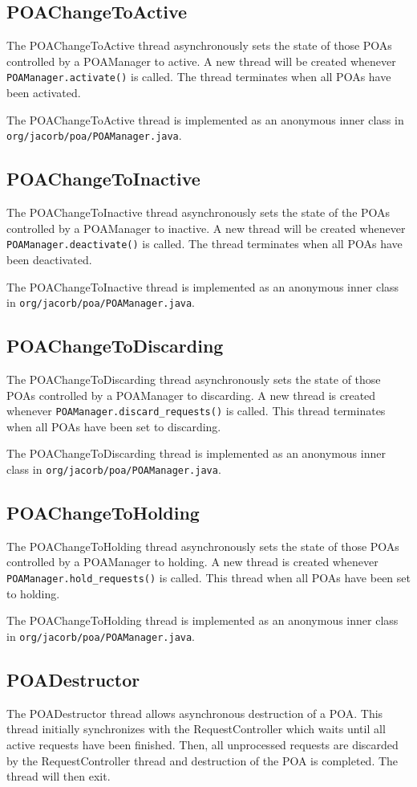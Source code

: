 \subsection*{POAChangeToActive}
The POAChangeToActive thread asynchronously sets the state of those POAs
controlled by a POAManager to active. A new thread will be created whenever
{\tt POAManager.activate()} is called. The thread terminates when all POAs
have been activated.

The POAChangeToActive thread is implemented as an anonymous inner class in
{\tt org/jacorb/poa/POAManager.java}.

\subsection*{POAChangeToInactive}
The POAChangeToInactive thread asynchronously sets the state of the POAs
controlled by a POAManager to inactive. A new thread will be created whenever
{\tt POAManager.deactivate()} is called. The thread terminates when all
POAs have been deactivated.

The POAChangeToInactive thread is implemented as an anonymous inner class in
{\tt org/jacorb/poa/POAManager.java}.

\subsection*{POAChangeToDiscarding}
The POAChangeToDiscarding thread asynchronously sets the state of those POAs
controlled by a POAManager to discarding. A new thread is created whenever
{\tt POAManager.discard\_requests()} is called. This thread terminates when
all POAs have been set to discarding.

The POAChangeToDiscarding thread is implemented as an anonymous inner class in
{\tt org/jacorb/poa/POAManager.java}.

\subsection*{POAChangeToHolding}
The POAChangeToHolding thread asynchronously sets the state of those POAs
controlled by a POAManager to holding. A new thread is created whenever
{\tt POAManager.hold\_requests()} is called. This thread when all POAs have
been set to holding.

The POAChangeToHolding thread is implemented as an anonymous inner class in
{\tt org/jacorb/poa/POAManager.java}.

\subsection*{POADestructor}
The POADestructor thread allows asynchronous destruction of a POA. This thread
initially synchronizes with the RequestController which waits until all active
requests have been finished. Then, all unprocessed requests are discarded
by the RequestController thread and destruction of the POA is completed. The
thread will then exit.

